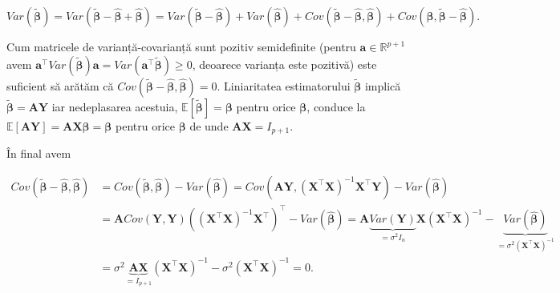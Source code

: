 \documentclass[]{article}
\begin{document}
\[
  Var(\tilde{\boldsymbol \beta}) = Var(\tilde{\boldsymbol \beta} - \hat{\boldsymbol \beta} + \hat{\boldsymbol \beta}) = Var(\tilde{\boldsymbol \beta} - \hat{\boldsymbol \beta}) + Var(\hat{\boldsymbol \beta}) + Cov(\tilde{\boldsymbol \beta} - \hat{\boldsymbol \beta}, \hat{\boldsymbol \beta}) + Cov(\hat{\boldsymbol \beta}, \tilde{\boldsymbol \beta} - \hat{\boldsymbol \beta}).
\]

Cum matricele de varianță-covarianță sunt pozitiv semidefinite (pentru
\(\boldsymbol a\in\mathbb{R}^{p+1}\) avem
\(\boldsymbol a^\intercal Var(\tilde{\boldsymbol \beta})\boldsymbol a = Var(\boldsymbol a^\intercal\tilde{\boldsymbol \beta})\geq 0\),
deoarece varianța este pozitivă) este suficient să arătăm că
\(Cov(\tilde{\boldsymbol \beta} - \hat{\boldsymbol \beta}, \hat{\boldsymbol \beta}) = 0\).
Liniaritatea estimatorului \(\tilde{\boldsymbol \beta}\) implică
\(\tilde{\boldsymbol \beta} = \boldsymbol A\boldsymbol Y\) iar
nedeplasarea acestuia,
\(\mathbb{E}[\tilde{\boldsymbol \beta}] = \boldsymbol \beta\) pentru
orice \(\boldsymbol \beta\), conduce la
\(\mathbb{E}[\boldsymbol A\boldsymbol Y] = \boldsymbol A\boldsymbol X\boldsymbol \beta = \boldsymbol \beta\)
pentru orice \(\boldsymbol \beta\) de unde
\(\boldsymbol A\boldsymbol X = I_{p+1}\).

În final avem

\begin{align*}
  Cov(\tilde{\boldsymbol \beta} - \hat{\boldsymbol \beta}, \hat{\boldsymbol \beta}) &= Cov(\tilde{\boldsymbol \beta}, \hat{\boldsymbol \beta}) - Var(\hat{\boldsymbol \beta}) = Cov\left(\boldsymbol A\boldsymbol Y, (\boldsymbol X^\intercal \boldsymbol X)^{-1} \boldsymbol X^\intercal \boldsymbol Y\right) - Var(\hat{\boldsymbol \beta})\\
  &= \boldsymbol A Cov\left(\boldsymbol Y, \boldsymbol Y\right) \left((\boldsymbol X^\intercal \boldsymbol X)^{-1} \boldsymbol X^\intercal\right)^\intercal - Var(\hat{\boldsymbol \beta}) = \boldsymbol A \underbrace{Var\left(\boldsymbol Y\right)}_{=\sigma^2 I_n}\boldsymbol X (\boldsymbol X^\intercal \boldsymbol X)^{-1} - \underbrace{Var(\hat{\boldsymbol \beta})}_{=\sigma^2 (\boldsymbol X^\intercal \boldsymbol X)^{-1}}\\
  &=  \sigma^2\underbrace{\boldsymbol A \boldsymbol X}_{= I_{p+1}} (\boldsymbol X^\intercal \boldsymbol X)^{-1} - \sigma^2 (\boldsymbol X^\intercal \boldsymbol X)^{-1} = 0.
\end{align*}
\end{document}
